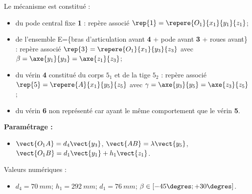 Le mécanisme est constitué : 
\begin{itemize}
 \item du pode central fixe \textbf{1} : repère associé $\rep{1}=\repere{O_1}{x_1}{y_1}{z_1}$;
 \item de l'ensemble  E=\{bras d’articulation avant \textbf{4} + pode avant \textbf{3} + roues avant\} : repère associé $\rep{3}=\repere{O_1}{x_1}{y_3}{z_3}$ avec $\beta = \axe{y_1}{y_3} =\axe{z_1}{z_3}$;
 \item du vérin \textbf{4} constitué du corps \textbf{$5_1$} et de la tige \textbf{$5_2$} : repère associé $\rep{5}=\repere{A}{x_1}{y_5}{z_5}$ avec
  $\gamma = \axe{y_3}{y_5}= \axe{z_3}{z_5}$;
 \item du vérin \textbf{6} non représenté car ayant le même comportement que le vérin \textbf{5}.
\end{itemize}

\textbf{Paramétrage :}
\begin{itemize}
 \item $\vect{O_1 A}=d_4\vect{y_3}$, $\vect{AB}=\lambda\vect{y_5}$, $\vect{O_1 B}=d_1\vect{y_1}+h_1\vect{z_1}$.
\end{itemize}

Valeurs numériques : 
\begin{itemize}
 \item $d_4 =\SI{70}{mm}$; $h_1 =\SI{292}{mm}$; $d_1 =\SI{76}{mm}$; $\beta \in \left[ -45\degres;+30\degres\right]$.
\end{itemize}
\fi

